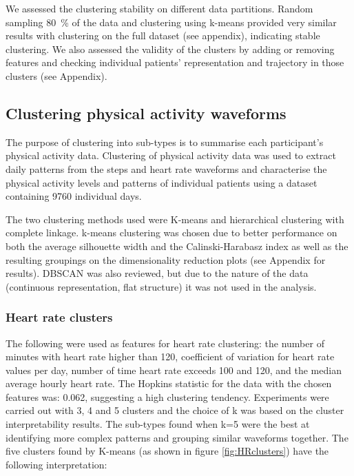 \documentclass{article}
\begin{document}
We assessed the clustering stability on different data partitions. Random sampling 80~\% of the data and clustering using k-means provided very similar results with clustering on the full dataset (see appendix), indicating stable clustering. We also assessed the validity of the clusters by adding or removing features and checking individual patients’ representation and trajectory in those clusters (see Appendix).

\subsection{Clustering physical activity waveforms} 

The purpose of clustering into sub-types is to summarise each participant's physical activity data. Clustering of physical activity data was used to extract daily patterns from the steps and heart rate waveforms and characterise the physical activity levels and patterns of individual patients using a dataset containing 9760 individual days. 

The two clustering methods used were K-means and hierarchical clustering with complete linkage. k-means clustering was chosen due to better performance on both the average silhouette width and the Calinski-Harabasz index as well as the resulting groupings on the dimensionality reduction plots (see Appendix for results).  DBSCAN was also reviewed, but due to the nature of the data (continuous representation, flat structure) it was not used in the analysis. 

\subsubsection{Heart rate clusters}

The following were used as features for heart rate clustering: the number of minutes with heart rate higher than 120, coefficient of variation for heart rate values per day, number of time heart rate exceeds 100 and 120, and the median average hourly heart rate. The Hopkins statistic for the data with the chosen features was: 0.062, suggesting a high clustering tendency. Experiments were carried out with 3, 4 and 5 clusters and the choice of k was based on the cluster interpretability results. The sub-types found when k=5 were the best at identifying more complex patterns and grouping similar waveforms together. 
The five clusters found by K-means (as shown in figure \ref{fig:HRclusters}) have the following interpretation: 
\end{document}
